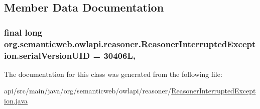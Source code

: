 \subsection{Member Data Documentation}
\hypertarget{classorg_1_1semanticweb_1_1owlapi_1_1reasoner_1_1_reasoner_interrupted_exception_a83f729152268077259ff3e87881ced80}{
\subsubsection[{serial\-Version\-U\-I\-D}]{\setlength{\rightskip}{0pt plus 5cm}final long org.\-semanticweb.\-owlapi.\-reasoner.\-Reasoner\-Interrupted\-Exception.\-serial\-Version\-U\-I\-D = 30406\-L\hspace{0.3cm}{\ttfamily [static]}, {\ttfamily [private]}}}\label{classorg_1_1semanticweb_1_1owlapi_1_1reasoner_1_1_reasoner_interrupted_exception_a83f729152268077259ff3e87881ced80}


The documentation for this class was generated from the following file\-:\begin{DoxyCompactItemize}
\item 
api/src/main/java/org/semanticweb/owlapi/reasoner/\hyperlink{_reasoner_interrupted_exception_8java}{Reasoner\-Interrupted\-Exception.\-java}\end{DoxyCompactItemize}
